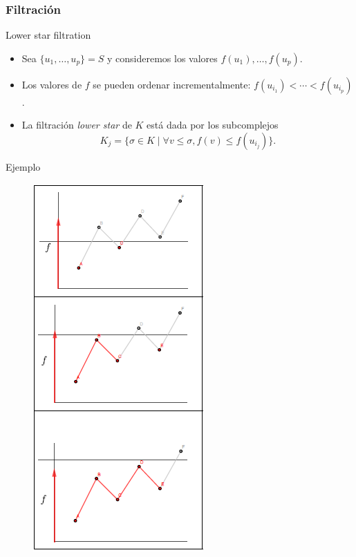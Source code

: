 \documentclass{beamer}
\begin{document}
\begin{frame}
\frametitle{Filtración}
\begin{block}{Lower star filtration}
\begin{itemize}
\item<2-> Sea $\{u_1,\dots, u_p\}=S$ y consideremos los valores $f(u_1),\dots, f(u_p)$.
\item<3-> Los valores de $f$ se pueden ordenar incrementalmente: $f(u_{i_1})<\cdots<f(u_{i_p})$. 
\item<4-> La filtración \emph{lower star} de $K$ está dada por los subcomplejos
\[
K_j=\{\sigma\in K\mid \forall v\leq\sigma, f(v)\leq f(u_{i_j})\}.
\]
\end{itemize}

\end{block}

\end{frame}



\begin{frame}
\begin{block}{Ejemplo}
\begin{figure}
\includegraphics[scale=0.55]{low}
\end{figure}
\end{block}
\end{frame}
\end{document}
